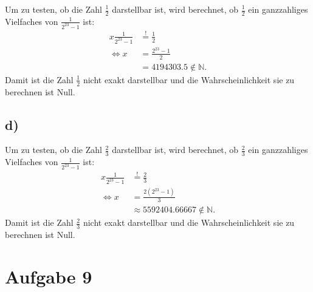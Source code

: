 \documentclass[a4paper, 11pt]{article}
\begin{document}
Um zu testen, ob die Zahl $\frac{1}{2}$ darstellbar ist, wird berechnet, ob $\frac{1}{2}$ ein ganzzahliges Vielfaches von $\frac{1}{2^{23} - 1}$ ist:
\begin{align}
    x \frac{1}{2^{23} - 1} &\overset{!}{=} \frac{1}{2} \\
    \Leftrightarrow x &= \frac{2^{23} - 1}{2} \\
    &= 4194303.5 \not\in \mathbb{N}.
\end{align}
Damit ist die Zahl $\frac{1}{2}$ nicht exakt darstellbar und die Wahrscheinlichkeit sie zu berechnen ist Null.

\subsection*{d)}
Um zu testen, ob die Zahl $\frac{2}{3}$ darstellbar ist, wird berechnet, ob $\frac{2}{3}$ ein ganzzahliges Vielfaches von $\frac{1}{2^{23} - 1}$ ist:
\begin{align}
    x \frac{1}{2^{23} - 1} &\overset{!}{=} \frac{2}{3} \\
    \Leftrightarrow x &= \frac{2(2^{23} - 1)}{3} \\
    &\approx 5592404.66667 \not\in \mathbb{N}.
\end{align}
Damit ist die Zahl $\frac{2}{3}$ nicht exakt darstellbar und die Wahrscheinlichkeit sie zu berechnen ist Null.

\section*{Aufgabe 9}
\end{document}
